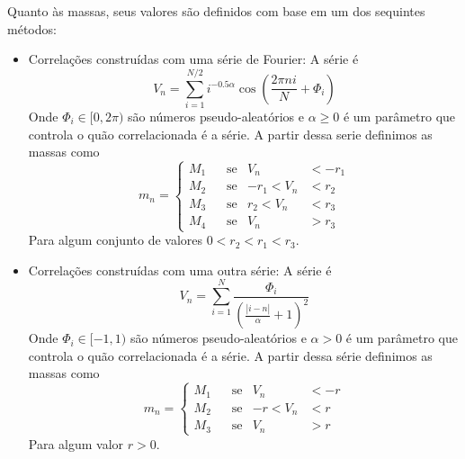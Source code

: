 \documentclass[
   article,                      %
   10pt,                         %
   openright,                    %
   oneside,                      %
   a4paper,                      %
   sumario = tradicional,        %
	chapter=TITLE,		%
	section=TITLE,		%
	subsection=TITLE,	%
	subsubsection=TITLE,%
   english,                      %
   french,                       %
   spanish,                      %
   brazil,                       %
   xcolor=table                  %
]{abntex2}
\begin{document}
Quanto às massas, seus valores são definidos com base em um dos sequintes
métodos:

\begin{itemize}[nosep]
   \item Correlações construídas com uma série de Fourier:
   A série é
   \begin{equation}
   V_n = \sum_{i=1}^{N/2} i^{-0.5\alpha}
   \cos\left (\frac{2\pi n i}{N} + \Phi_i\right )
   \end{equation}
   Onde $\Phi_i\in[0,2\pi)$ são números pseudo-aleatórios e $\alpha \geq 0$
   é um parâmetro que controla o quão correlacionada é a série.
   A partir dessa serie definimos as massas como
   \begin{equation}
   m_n = \left\{\begin{aligned}
   M_1&\;\;\; \text{se}&        V_n& < -r_1 \\
   M_2&\;\;\; \text{se}& -r_1 < V_n& < r_2 \\
   M_3&\;\;\; \text{se}&  r_2 < V_n& < r_3 \\
   M_4&\;\;\; \text{se}&        V_n& > r_3
   \end{aligned}\right.
   \end{equation}
   Para algum conjunto de valores $0 < r_2 < r_1 < r_3$.

   \item Correlações construídas com uma outra série: A série é
   \begin{equation}
   V_n = \sum_{i=1}^{N} \frac{\Phi_i}{
   \left(\frac{|i-n|}{\alpha}+1\right)^2}
   \end{equation}
   Onde $\Phi_i\in[-1,1)$ são números pseudo-aleatórios e $\alpha > 0$
   é um parâmetro que controla o quão correlacionada é a série.
   A partir dessa série definimos as massas como
   \begin{equation}
   m_n = \left \{\begin{aligned}
   M_1&\;\;\; \text{se}&        V_n& < -r \\
   M_2&\;\;\; \text{se}&    -r < V_n& < r \\
   M_3&\;\;\; \text{se}&      V_n& > r
   \end{aligned}\right .
   \end{equation}
   Para algum valor $r > 0$.


\end{itemize}
\end{document}
